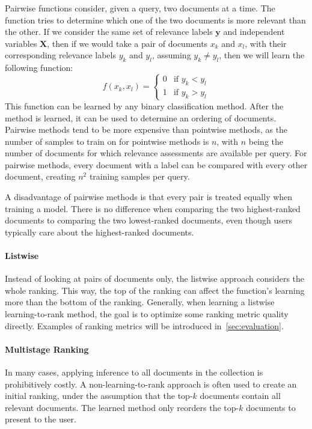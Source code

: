 Pairwise functions consider, given a query, two documents at a time. The function tries to determine which one of the two documents is more relevant than the other. If we consider the same set of relevance labels $\mathbf{y}$ and independent variables $\mathbf{X}$, then if we would take a pair of documents $x_k$ and $x_l$, with their corresponding relevance labels $y_k$ and $y_l$, assuming $y_k \neq y_l$, then we will learn the following function:
\begin{equation}
	f(x_k, x_l) = \begin{cases}
		0 & \text{if } y_k < y_l \\
		1 & \text{if } y_k > y_l
	\end{cases}
\end{equation}
This function can be learned by any binary classification method. After the method is learned, it can be used to determine an ordering of documents. 
Pairwise methods tend to be more expensive than pointwise methods, as the number of samples to train on for pointwise methods is $n$, with $n$ being the number of documents for which relevance assessments are available per query. For pairwise methods, every document with a label can be compared with every other document, creating $n^2$ training samples per query. 

A disadvantage of pairwise methods is that every pair is treated equally when training a model. There is no difference when comparing the two highest-ranked documents to comparing the two lowest-ranked documents, even though users typically care about the highest-ranked documents. 

\paragraph{Listwise} Instead of looking at pairs of documents only, the listwise approach considers the whole ranking. This way, the top of the ranking can affect the function's learning more than the bottom of the ranking.
Generally, when learning a listwise learning-to-rank method, the goal is to optimize some ranking metric quality directly. Examples of ranking metrics will be introduced in~\cref{sec:evaluation}.

\paragraph{Multistage Ranking}
\label{sec:multistage}
In many cases, applying inference to all documents in the collection is prohibitively costly. A non-learning-to-rank approach is often used to create an initial ranking, under the assumption that the top-$k$ documents contain all relevant documents. The learned method only reorders the top-$k$ documents to present to the user. 

